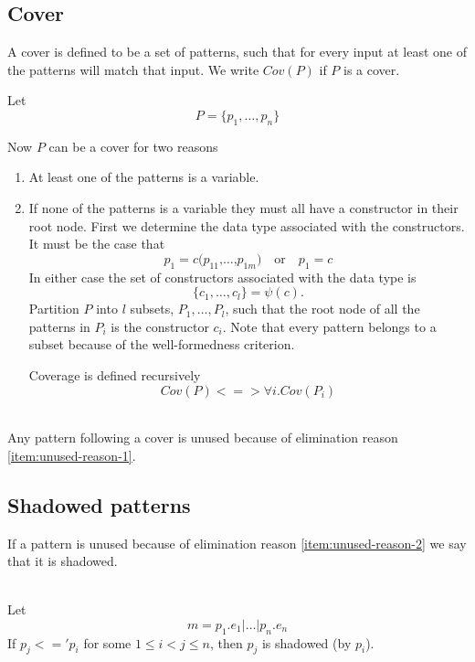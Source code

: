 \subsection{Cover}
\label{sec:cover}
A cover is defined to be a set of patterns, such that for every input at least one
of the patterns will match that input. We write $Cov(P)$ if $P$ is a cover.

Let
\[
P = \{p_1,\ldots,p_n\}
\]

Now $P$ can be a cover for two reasons

\begin{enumerate}
\item At least one of the patterns is a variable.
\item If none of the patterns is a variable they must all have a constructor in
  their root node. First we determine the data type associated with the
  constructors. It must be the case that
  \[
  p_1 = c \texttt{(} p_{11} \texttt{,} \ldots \texttt{,} p_{1m}\texttt{)}
  \quad \textrm{or} \quad
  p_1 = c
  \]
  In either case the set of constructors associated with the data type is
  \[
  \{c_1, \ldots, c_l\} = \psi(c).
  \]
  Partition $P$ into $l$ subsets, $P_1, \ldots, P_l$, such that the root node of
  all the patterns in $P_i$ is the constructor $c_i$. Note that every pattern
  belongs to a subset because of the well-formedness criterion.

  Coverage is defined recursively
  \[
  Cov(P) <=> \forall i. Cov(P_i)
  \]
\end{enumerate}

\begin{lemma}\ \\
  Any pattern following a cover is unused because of elimination reason
  \ref{item:unused-reason-1}.
\end{lemma}

\subsection{Shadowed patterns}
\label{sec:shadowed-patterns}
If a pattern is unused because of elimination reason \ref{item:unused-reason-2} we say that
it is shadowed.
\begin{definition}[Shadowed]\ \\
  Let
  \[
  m = p_1\texttt{.}e_1 \texttt{|} \ldots \texttt{|} p_n\texttt{.}e_n
  \]
  If $p_j <=' p_i$ for some $1 \leq i < j \leq n$, then $p_j$ is shadowed (by
  $p_i$).
\end{definition}

